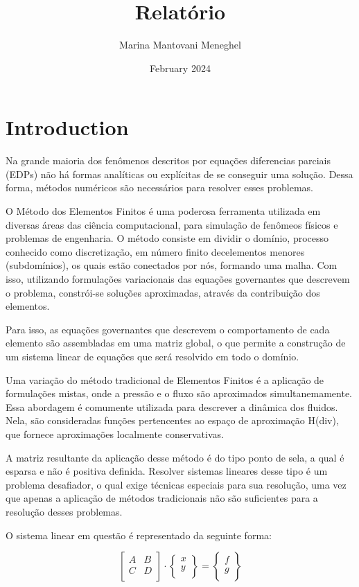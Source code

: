 \documentclass[12pt]{article}
\title{Relatório}
\author{Marina Mantovani Meneghel}
\date{February 2024}
\begin{document}
\maketitle

\section{Introduction}

Na grande maioria dos fenômenos descritos por equações diferencias parciais (EDPs) não há formas analíticas ou explícitas de se 
conseguir uma solução. Dessa forma, métodos numéricos são necessários para resolver esses problemas.

O Método dos Elementos Finitos é uma poderosa ferramenta utilizada em diversas áreas das ciência computacional, para simulação de 
fenômeos físicos e problemas de engenharia. O método consiste em dividir o domínio, processo conhecido como discretização, em número 
finito decelementos menores (subdomínios), os quais estão conectados por nós, formando uma malha. Com isso, utilizando formulações 
variacionais das equações governantes que descrevem o problema, constrói-se soluções aproximadas, através da contribuição dos elementos.

Para isso, as equações governantes que descrevem o comportamento de cada elemento são assembladas em uma matriz global, o que permite 
a construção de um sistema linear de equações que será resolvido em todo o domínio.

Uma variação do método tradicional de Elementos Finitos é a aplicação de formulações mistas, onde a pressão e o fluxo são aproximados 
simultanemamente. Essa abordagem é comumente utilizada para descrever a dinâmica dos fluidos. Nela, são consideradas funções pertencentes
ao espaço de aproximação H(div), que fornece aproximações localmente conservativas. 

A matriz resultante da aplicação desse método é do tipo ponto de sela, a qual é esparsa e não é positiva definida. Resolver sistemas
lineares desse tipo é um problema desafiador, o qual exige técnicas especiais para sua resolução, uma vez que apenas a aplicação de 
métodos tradicionais não são suficientes para a resolução desses problemas.

O sistema linear em questão é representado da seguinte forma: 

\begin{equation} \label{eq:system}
    \begin{bmatrix}
        A & B \\
        C & D \\
    \end{bmatrix}
    \cdot
    \begin{Bmatrix}
        x \\
        y \\
    \end{Bmatrix}
    =
    \begin{Bmatrix}
        f \\
        g \\
    \end{Bmatrix}
\end{equation}
\end{document}
